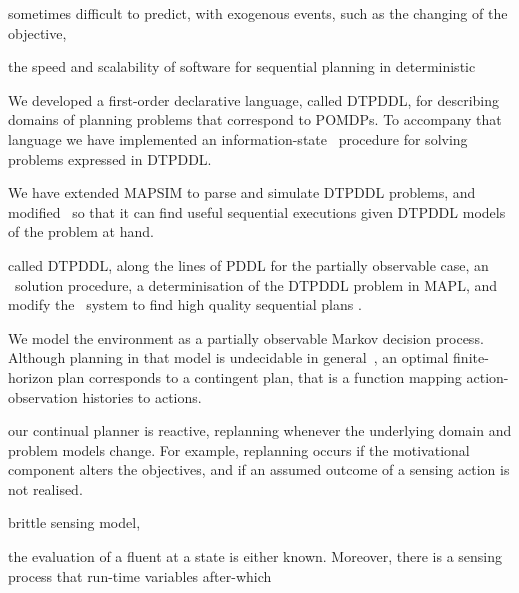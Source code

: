 \documentclass[letterpaper]{article}
\begin{document}
sometimes difficult to predict, with exogenous events, such as the
changing of the objective, 





the speed and scalability of software for sequential planning in
deterministic




We developed a first-order declarative language, called DTPDDL, for
describing domains of planning problems that correspond to POMDPs.  To
accompany that language we have implemented an information-state
\laostar\ procedure for solving problems expressed in DTPDDL. 

We have extended MAPSIM to parse and simulate DTPDDL problems, and
modified \fastdownward\ so that it can find useful sequential executions
given DTPDDL models of the problem at hand.




 called DTPDDL, along
the lines of PDDL for the partially observable case, an \laostar\
solution procedure, a determinisation of the DTPDDL problem in MAPL,
and modify the \fastdownward\ system to find high quality sequential plans
.

We model the environment as a partially observable Markov decision
process. Although planning in that model is undecidable in
general~\cite{}, an optimal finite-horizon plan corresponds to a
contingent plan, that is a function mapping action-observation
histories to actions.

our continual planner is reactive, replanning whenever the underlying
domain and problem models change. For example, replanning occurs if
the motivational component alters the objectives, and if an assumed
outcome of a sensing action is not realised.

brittle sensing model, 

the evaluation of a fluent at a state is either known. Moreover, there
is a sensing process that run-time variables  after-which 


\end{document}
